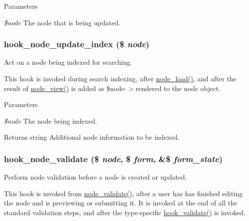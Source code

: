 \begin{DoxyParams}{Parameters}
\item[{\em \$node}]The node that is being updated. \end{DoxyParams}
\hypertarget{group__node__api__hooks_gac8420f204c69a4dc641f4d809a870b05}{
\subsubsection[{hook\_\-node\_\-update\_\-index}]{\setlength{\rightskip}{0pt plus 5cm}hook\_\-node\_\-update\_\-index (\$ {\em node})}}
\label{group__node__api__hooks_gac8420f204c69a4dc641f4d809a870b05}
Act on a node being indexed for searching.

This hook is invoked during search indexing, after \hyperlink{node_8module_a492ddfc12843e71242bb484a44e51a19}{node\_\-load()}, and after the result of \hyperlink{node_8module_ac2c64fdfacc25be79a6ecf406ab62320}{node\_\-view()} is added as \$node-\/$>$rendered to the node object.


\begin{DoxyParams}{Parameters}
\item[{\em \$node}]The node being indexed.\end{DoxyParams}
\begin{DoxyReturn}{Returns}
string Additional node information to be indexed. 
\end{DoxyReturn}
\hypertarget{group__node__api__hooks_gad26227eaf0dd513134767a11be40ab1d}{
\subsubsection[{hook\_\-node\_\-validate}]{\setlength{\rightskip}{0pt plus 5cm}hook\_\-node\_\-validate (\$ {\em node}, \/  \$ {\em form}, \/  \&\$ {\em form\_\-state})}}
\label{group__node__api__hooks_gad26227eaf0dd513134767a11be40ab1d}
Perform node validation before a node is created or updated.

This hook is invoked from \hyperlink{node_8module_a9f5f6b14ffa70a478e11e60b1fe9d254}{node\_\-validate()}, after a user has has finished editing the node and is previewing or submitting it. It is invoked at the end of all the standard validation steps, and after the type-\/specific \hyperlink{group__node__api__hooks_gacaf7cff104c642c28f76ce7ec5f33f40}{hook\_\-validate()} is invoked.


